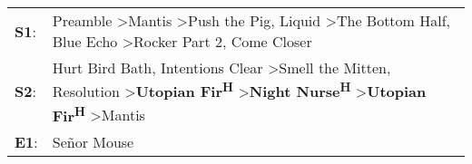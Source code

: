 \begin{supertabular}{p{0.03\textwidth}p{0.92\textwidth}}
 \textbf{S1}:  &                                                           Preamble\textsuperscript{} \textgreater \enspace Mantis\textsuperscript{} \textgreater \enspace Push the Pig\textsuperscript{}, \enspace Liquid\textsuperscript{} \textgreater \enspace The Bottom Half\textsuperscript{}, \enspace Blue Echo\textsuperscript{} \textgreater \enspace Rocker Part 2\textsuperscript{}, \enspace Come Closer\textsuperscript{}  \enspace  \\
 \textbf{S2}:  &  Hurt Bird Bath\textsuperscript{}, \enspace Intentions Clear\textsuperscript{} \textgreater \enspace Smell the Mitten\textsuperscript{}, \enspace Resolution\textsuperscript{} \textgreater \enspace \textbf{Utopian Fir\textsuperscript{H}} \textgreater \enspace \textbf{Night Nurse\textsuperscript{H}} \textgreater \enspace \textbf{Utopian Fir\textsuperscript{H}} \textgreater \enspace Mantis\textsuperscript{}  \enspace  \\
 \textbf{E1}:  &                                                                                                                                                                                                                                                                                                                                                                                           Señor Mouse\textsuperscript{}  \enspace  \\
\end{supertabular}
